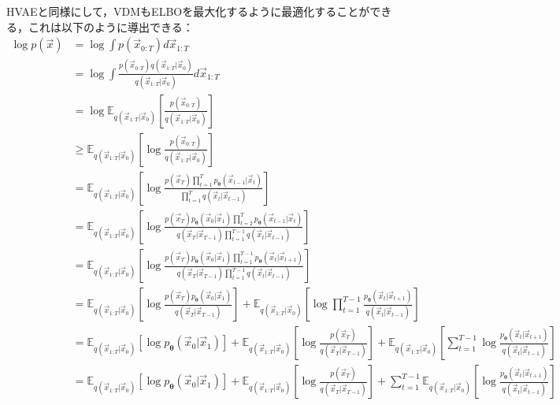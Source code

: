 HVAEと同様にして，VDMもELBOを最大化するように最適化することができる，これは以下のように導出できる：
\begingroup
\allowdisplaybreaks
\begin{align}
{\log p(\vec{x})}
&= {\log \int p(\vec{x}_{0:T}) d\vec{x}_{1:T}}\\
&= {\log \int \frac{p(\vec{x}_{0:T})q(\vec{x}_{1:T}|\vec{x}_0)}{q(\vec{x}_{1:T}|\vec{x}_0)} d\vec{x}_{1:T}}\\
&= {\log \mathbb{E}_{q(\vec{x}_{1:T}|\vec{x}_0)}\left[\frac{p(\vec{x}_{0:T})}{q(\vec{x}_{1:T}|\vec{x}_0)}\right]}\\
&\geq {\mathbb{E}_{q(\vec{x}_{1:T}|\vec{x}_0)}\left[\log \frac{p(\vec{x}_{0:T})}{q(\vec{x}_{1:T}|\vec{x}_0)}\right]} \label{eq:34}\\
&= {\mathbb{E}_{q(\vec{x}_{1:T}|\vec{x}_0)}\left[\log \frac{p(\vec{x}_T)\prod_{t=1}^{T}p_{\bm{\theta}}(\vec{x}_{t-1}|\vec{x}_t)}{\prod_{t = 1}^{T}q(\vec{x}_{t}|\vec{x}_{t-1})}\right]}\\
&= {\mathbb{E}_{q(\vec{x}_{1:T}|\vec{x}_0)}\left[\log \frac{p(\vec{x}_T)p_{\bm{\theta}}(\vec{x}_0|\vec{x}_1)\prod_{t=2}^{T}p_{\bm{\theta}}(\vec{x}_{t-1}|\vec{x}_t)}{q(\vec{x}_T|\vec{x}_{T-1})\prod_{t = 1}^{T-1}q(\vec{x}_{t}|\vec{x}_{t-1})}\right]}\\
&= {\mathbb{E}_{q(\vec{x}_{1:T}|\vec{x}_0)}\left[\log \frac{p(\vec{x}_T)p_{\bm{\theta}}(\vec{x}_0|\vec{x}_1)\prod_{t=1}^{T-1}p_{\bm{\theta}}(\vec{x}_{t}|\vec{x}_{t+1})}{q(\vec{x}_T|\vec{x}_{T-1})\prod_{t = 1}^{T-1}q(\vec{x}_{t}|\vec{x}_{t-1})}\right]}\\
&= {\mathbb{E}_{q(\vec{x}_{1:T}|\vec{x}_0)}\left[\log \frac{p(\vec{x}_T)p_{\bm{\theta}}(\vec{x}_0|\vec{x}_1)}{q(\vec{x}_T|\vec{x}_{T-1})}\right] + \mathbb{E}_{q(\vec{x}_{1:T}|\vec{x}_0)}\left[\log \prod_{t = 1}^{T-1}\frac{p_{\bm{\theta}}(\vec{x}_{t}|\vec{x}_{t+1})}{q(\vec{x}_{t}|\vec{x}_{t-1})}\right]}\\
&= {\mathbb{E}_{q(\vec{x}_{1:T}|\vec{x}_0)}\left[\log p_{\bm{\theta}}(\vec{x}_0|\vec{x}_1)\right] + \mathbb{E}_{q(\vec{x}_{1:T}|\vec{x}_0)}\left[\log \frac{p(\vec{x}_T)}{q(\vec{x}_T|\vec{x}_{T-1})}\right] + \mathbb{E}_{q(\vec{x}_{1:T}|\vec{x}_0)}\left[ \sum_{t=1}^{T-1} \log \frac{p_{\bm{\theta}}(\vec{x}_{t}|\vec{x}_{t+1})}{q(\vec{x}_{t}|\vec{x}_{t-1})}\right]}\\
&= {\mathbb{E}_{q(\vec{x}_{1:T}|\vec{x}_0)}\left[\log p_{\bm{\theta}}(\vec{x}_0|\vec{x}_1)\right] + \mathbb{E}_{q(\vec{x}_{1:T}|\vec{x}_0)}\left[\log \frac{p(\vec{x}_T)}{q(\vec{x}_T|\vec{x}_{T-1})}\right] + \sum_{t=1}^{T-1}\mathbb{E}_{q(\vec{x}_{1:T}|\vec{x}_0)}\left[ \log \frac{p_{\bm{\theta}}(\vec{x}_{t}|\vec{x}_{t+1})}{q(\vec{x}_{t}|\vec{x}_{t-1})}\right]}\\

\end{align}
